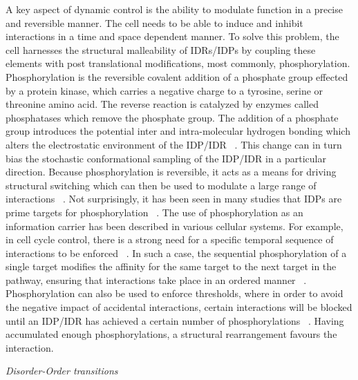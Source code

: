 A key aspect of dynamic control is the ability to modulate function in a precise and reversible manner.  The cell needs to be able to induce and inhibit interactions in a time and space dependent manner. To solve this problem, the cell harnesses the structural malleability of IDRs/IDPs by coupling these elements with post translational modifications, most commonly, phosphorylation. Phosphorylation is the reversible covalent addition of a phosphate  group effected by a protein kinase,  which carries a negative  charge to a tyrosine, serine or threonine  amino acid. The reverse reaction is catalyzed by enzymes called phosphatases which remove the phosphate group. The addition of a phosphate group introduces the potential inter and intra-molecular hydrogen bonding which alters the electrostatic environment of the IDP/IDR ~\cite{van1990effect}. This change can in turn bias the stochastic conformational sampling of the IDP/IDR in a particular direction. Because phosphorylation is reversible, it acts as a means for driving structural switching which can then be used to modulate a large range of interactions ~\cite{kern1999structure, ramelot2001phosphorylation, oxley2008integrin}. Not surprisingly, it has been seen in many studies that IDPs are prime targets for phosphorylation ~\cite{iakoucheva2004importance}.  The use of phosphorylation as an information carrier has been described in various cellular systems. For example, in cell cycle control, there is a strong need for a specific temporal sequence of interactions to be enforced ~\cite{yoon2012cell}. In such a case, the sequential phosphorylation of a single target modifies the affinity for the same target to the next target in the pathway, ensuring that interactions take place in an ordered manner ~\cite{wright2015intrinsically}. Phosphorylation can also be used to enforce thresholds, where in order to avoid the negative impact of accidental interactions, certain interactions will be blocked until an IDP/IDR has achieved a certain number of phosphorylations ~\cite{nash2001multisite}. Having accumulated enough phosphorylations, a structural rearrangement favours the interaction. 

{\it Disorder-Order transitions}

